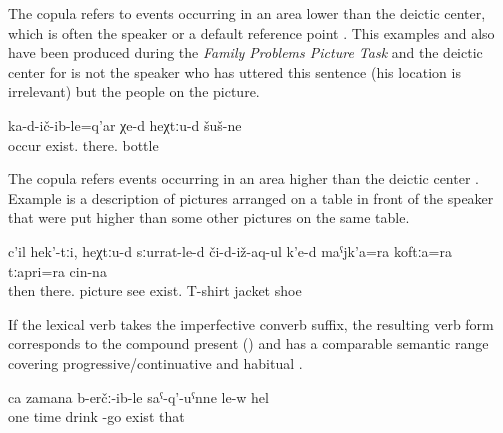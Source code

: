 The copula  refers to events occurring in an area lower than the deictic center, which is often the speaker or a default reference point . This examples and also  have been produced during the \textit{Family Problems Picture Task} \citep{SanRoqueEtAl2012} and the deictic center for  is not the speaker who has uttered this sentence (his location is irrelevant) but the people on the picture. 
%
\begin{exe}
	\ex	\label{ex:There bottles have fallen down periphrastic}
	\gll	ka-d-ič-ib-le=q'ar	χe-d	heχtːu-d	šuš-ne\\
		occur	exist.	there.	bottle\\
	\glt	{}
\end{exe}

The copula  refers events occurring in an area higher than the deictic center . Example  is a description of pictures arranged on a table in front of the speaker that were put higher than some other pictures on the same table.  

\begin{exe}
	\ex	\label{ex:Then there one the picture it shows there are his T-shirt, jacket, and shoes.}
	\gll	c'il	hek'-tːi,	heχtːu-d	sːurrat-le-d	či-d-iž-aq-ul	k'e-d	maˁjk'a=ra	koftːa=ra		tːapri=ra	cin-na\\
		then		there.	picture	see	exist.	T-shirt\tsc{=add}	jacket		shoe	\\
	\glt	{}
\end{exe}

If the lexical verb takes the imperfective converb suffix, the resulting verb form corresponds to the compound present () and has a comparable semantic range covering progressive\slash continuative  and habitual .
%
\begin{exe}
	\ex	\label{ex:One time he comes home drunk}
	\gll	ca	zamana	b-erčː-ib-le	saˁ-q'-uˁnne	le-w	hel\\
		one	time	drink	-go	exist	that\\
	\glt	{}
\end{exe}



